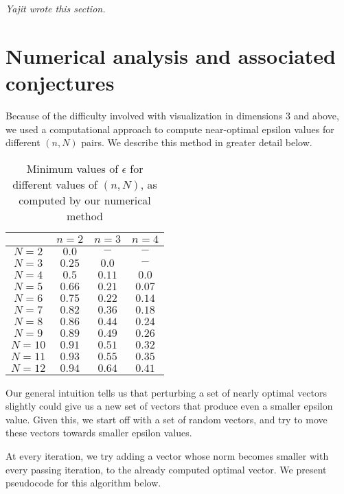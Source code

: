 \documentclass[11pt,letterpaper,twoside,english]{article}
\theoremstyle{theorem}
\theoremstyle{remark}
\begin{document}
{\itshape Yajit wrote this section.}


\section{Numerical analysis and associated conjectures}

Because of the difficulty involved with visualization in dimensions 3 and above, we used a computational approach to compute near-optimal epsilon values for different $(n, N)$ pairs. We describe this method in greater detail below.

\begin{table}
   \centering
    \begin{tabular}{ | c | c | c | c |}
    \hline
      & $n=2$ & $n=3$ & $n=4$ \\ \hline
    $N=2$ & $0.0$ & $-$ & $-$ \\ \hline
    $N=3$ & $0.25$ & $0.0$ & $-$ \\ \hline
    $N=4$ & $0.5$ & $0.11$ & $0.0$ \\ \hline
    $N=5$ & $0.66$ & $0.21$ & $0.07$ \\ \hline
    $N=6$ & $0.75$ & $0.22$ & $0.14$ \\ \hline
    $N=7$ & $0.82$ & $0.36$ & $0.18$ \\ \hline
    $N=8$ &  $0.86$ & $0.44$ & $0.24$ \\ \hline
    $N=9$ &  $0.89$ & $0.49$ & $0.26$ \\ \hline
    $N=10$ & $0.91$ & $0.51$ & $0.32$ \\ \hline
    $N=11$ & $0.93$  & $0.55$ & $0.35$ \\ \hline
    $N=12$ & $0.94$ & $0.64$ & $0.41$ \\
    \hline
    \end{tabular}
    \caption {Minimum values of $\epsilon$ for different values of $(n, N)$, as computed by our numerical method}
\end{table}

Our general intuition tells us that perturbing a set of nearly optimal vectors slightly could give us a new set of vectors that produce even a smaller epsilon value. Given this, we start off with a set of random vectors, and try to move these vectors towards smaller epsilon values.

At every iteration, we try adding a vector whose norm becomes smaller with every passing iteration, to the already computed optimal vector. We present pseudocode for this algorithm below.
\end{document}
